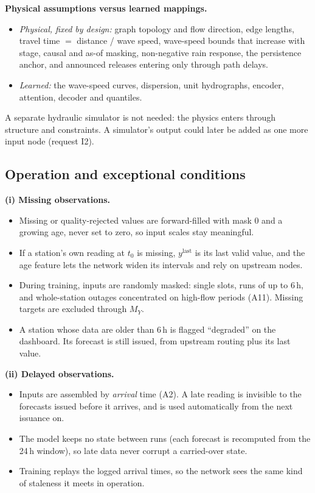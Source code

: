\textbf{Physical assumptions versus learned mappings.}
\begin{itemize}
\item \emph{Physical, fixed by design:} graph topology and flow direction, edge lengths, travel time
$=$ distance / wave speed, wave-speed bounds that increase with stage, causal and as-of masking,
non-negative rain response, the persistence anchor, and announced releases entering only through path delays.
\item \emph{Learned:} the wave-speed curves, dispersion, unit hydrographs, encoder, attention, decoder and quantiles.
\end{itemize}
A separate hydraulic simulator is not needed: the physics enters through structure and constraints. A simulator's
output could later be added as one more input node (request I2).

\subsection{Operation and exceptional conditions}
\label{sec:q1-ops}

\textbf{(i) Missing observations.}
\begin{itemize}
\item Missing or quality-rejected values are forward-filled with mask 0 and a growing age, never set to zero, so
input scales stay meaningful.
\item If a station's own reading at $t_0$ is missing, $y^{\text{last}}$ is its last valid value, and the age
feature lets the network widen its intervals and rely on upstream nodes.
\item During training, inputs are randomly masked: single slots, runs of up to 6\,h, and whole-station outages
concentrated on high-flow periods (A11). Missing targets are excluded through $M_Y$.
\item A station whose data are older than 6\,h is flagged ``degraded'' on the dashboard. Its forecast is still
issued, from upstream routing plus its last value.
\end{itemize}

\textbf{(ii) Delayed observations.}
\begin{itemize}
\item Inputs are assembled by \emph{arrival} time (A2). A late reading is invisible to the forecasts issued
before it arrives, and is used automatically from the next issuance on.
\item The model keeps no state between runs (each forecast is recomputed from the 24\,h window), so late data
never corrupt a carried-over state.
\item Training replays the logged arrival times, so the network sees the same kind of staleness it meets in
operation.
\end{itemize}


